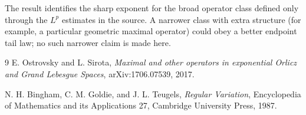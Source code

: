 \documentclass[11pt]{article}
\begin{document}
The result identifies the sharp exponent for the broad operator class defined
only through the \(L^p\) estimates in the source.  A narrower class with extra
structure (for example, a particular geometric maximal operator) could obey a
better endpoint tail law; no such narrower claim is made here.

\begin{thebibliography}{9}
E. Ostrovsky and L. Sirota,
\emph{Maximal and other operators in exponential Orlicz and Grand Lebesgue
Spaces}, arXiv:1706.07539, 2017.

N. H. Bingham, C. M. Goldie, and J. L. Teugels,
\emph{Regular Variation}, Encyclopedia of Mathematics and its Applications
27, Cambridge University Press, 1987.
\end{thebibliography}
\end{document}
